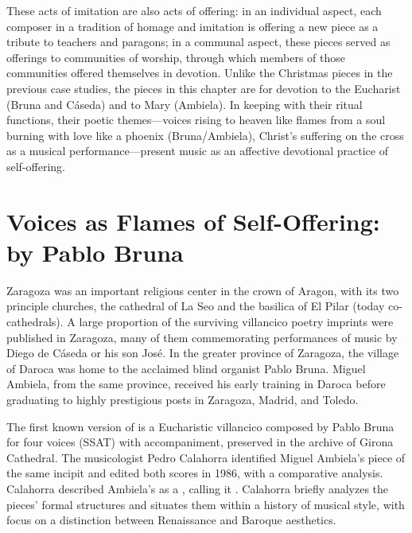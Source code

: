 These acts of imitation are also acts of offering: in an individual aspect, each
composer in a tradition of homage and imitation is offering a new piece as a
tribute to teachers and paragons; in a communal aspect, these pieces served as
offerings to communities of worship, through which members of those communities
offered themselves in devotion. 
Unlike the Christmas pieces in the previous case studies, the pieces in this
chapter are for devotion to the Eucharist (Bruna and Cáseda) and to Mary
(Ambiela).  
In keeping with their ritual functions, their poetic themes---voices rising to
heaven like flames from a soul burning with love like a phoenix (Bruna/Ambiela),
Christ's suffering on the cross as a musical performance---present music as an
affective devotional practice of self-offering.

\section{Voices as Flames of Self-Offering: 
 by Pablo Bruna}

Zaragoza was an important religious center in the crown of Aragon, with its two
principle churches, the cathedral of La Seo and the basilica of El Pilar (today
co-cathedrals).  
A large proportion of the surviving villancico poetry imprints were published in
Zaragoza, many of them commemorating performances of music by Diego de Cáseda or
his son José.
In the greater province of Zaragoza, the village of Daroca was home to the
acclaimed blind organist Pablo Bruna.  
Miguel Ambiela, from the same province, received his early training in Daroca
before graduating to highly prestigious posts in Zaragoza, Madrid, and Toledo.

The first known version of  is a Eucharistic
villancico composed by Pablo Bruna for four voices (SSAT) with accompaniment,
preserved in the archive of Girona Cathedral.%
    \citXXX[signature]
The musicologist Pedro Calahorra identified Miguel Ambiela's piece of the same
incipit and edited both scores in 1986, with a comparative analysis.
Calahorra described Ambiela's  as a , calling it .%
    \Autocite[9]{Calahorra:Suban}
Calahorra briefly analyzes the pieces' formal structures and situates them
within a history of musical style, with focus on a distinction between
Renaissance and Baroque aesthetics.

